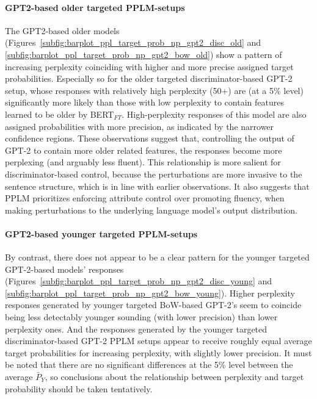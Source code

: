 \paragraph{GPT2-based older targeted PPLM-setups} The GPT2-based older models (Figures~\ref{subfig:barplot_ppl_target_prob_np_gpt2_disc_old} and \ref{subfig:barplot_ppl_target_prob_np_gpt2_bow_old}) show a pattern of increasing perplexity coinciding with higher and more precise assigned target probabilities. Especially so for the older targeted discriminator-based GPT-2 setup, whose responses with relatively high perplexity (50+) are (at a 5\% level) significantly more likely than those with low perplexity to contain features learned to be older by BERT$_{FT}$. High-perplexity responses of this model are also assigned probabilities with more precision, as indicated by the narrower confidence regions. These observations suggest that, controlling the output of GPT-2 to contain more older related features, the responses become more perplexing (and arguably less fluent). This relationship is more salient for discriminator-based control, because the perturbations are more invasive to the sentence structure, which is in line with earlier observations. It also suggests that PPLM prioritizes enforcing attribute control over promoting fluency, when making perturbations to the underlying language model's output distribution.  
\paragraph{GPT2-based younger targeted PPLM-setups} By contrast, there does not appear to be a clear pattern for the younger targeted GPT-2-based models' responses (Figures~\ref{subfig:barplot_ppl_target_prob_np_gpt2_disc_young} and \ref{subfig:barplot_ppl_target_prob_np_gpt2_bow_young}). Higher perplexity responses generated by younger targeted BoW-based GPT-2's seem to coincide being less detectably younger sounding (with lower precision) than lower perplexity ones. And the responses generated by the younger targeted discriminator-based GPT-2 PPLM setups appear to receive roughly equal average target probabilities for increasing perplexity, with slightly lower precision. It must be noted that there are no significant differences at the 5\% level between the average $\bar{P}_Y$, so conclusions about the relationship between perplexity and target probability should be taken tentatively.

